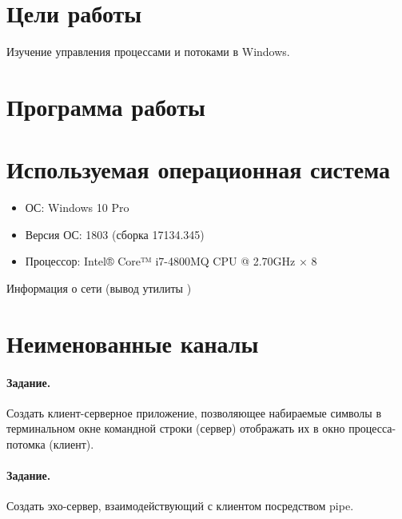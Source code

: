 





\tableofcontents
\newpage

\section{Цели работы}

Изучение управления процессами и потоками в Windows.

\section{Программа работы}



\section{Используемая операционная система}

\begin{itemize}
	\item ОС: Windows 10 Pro
	\item Версия ОС: 1803 (сборка 17134.345)
	\item Процессор: Intel® Core™ i7-4800MQ CPU @ 2.70GHz × 8
\end{itemize}

\noindent Информация о сети (вывод утилиты )



\newpage

\section{Неименованные каналы}

\paragraph{Задание.} Создать клиент-серверное приложение, позволяющее набираемые символы в терминальном окне командной строки (сервер) отображать их в окно процесса-потомка (клиент).

\paragraph{Задание.} Создать эхо-сервер, взаимодействующий с клиентом посредством pipe.

